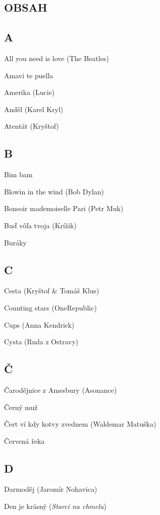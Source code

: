 \begin{LARGE}
    \section*{\Huge OBSAH}
\end{LARGE}

\begin{multicols}{2}

\subsection*{A}
All you need is love (The Beatles)

Amavi te puella

Amerika (Lucie)

Anděl (Karel Kryl)

Atentát (Kryštof)

\subsection*{B}
Bim bam

Blowin in the wind (Bob Dylan)

Bonsoir mademoiselle Pari (Petr Muk)

Buď vôľa tvoja (Krížik)

Buráky

\subsection*{C}
Cesta (Kryštof \& Tomáš Klus)

Counting stars (OneRepublic)

Cups (Anna Kendrick)

Cysta (Ruda z Ostravy)

\subsection*{Č}
Čarodějnice z Amesbury (Asonance)

Černý muž

Čert ví kdy kotvy zvednem (Waldemar Matuška)

Červená řeka

\subsection*{D}
Darmoděj (Jaromír Nohavica)

Den je krásný (\emph{Starci na chmelu})


\end{multicols}
